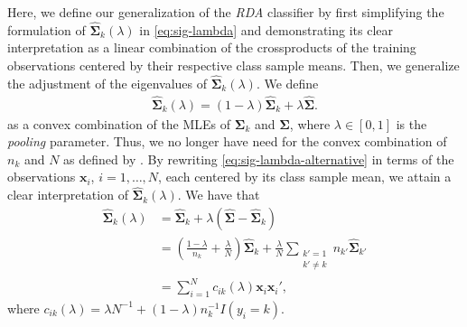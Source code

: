 \documentclass[11pt]{article}
\begin{document}
Here, we define our generalization of the \emph{RDA} classifier by first simplifying the formulation of $\widehat{\bm \Sigma}_k(\lambda)$ in \eqref{eq:sig-lambda} and demonstrating its clear interpretation as a linear combination of the crossproducts of the training observations centered by their respective class sample means. Then, we generalize the adjustment of the eigenvalues of $\widehat{\bm \Sigma}_k(\lambda)$.  We define
\begin{align}
  \widehat{\bm\Sigma}_k(\lambda) = (1 - \lambda) \widehat{\bm\Sigma}_k + \lambda \widehat{\bm\Sigma}.\label{eq:sig-lambda-alternative}
\end{align}
as a convex combination of the MLEs of $\bm \Sigma_k$ and $\bm \Sigma$, where $\lambda \in [0, 1]$ is the \emph{pooling} parameter. Thus, we no longer have need for the convex combination of $n_k$ and $N$ as defined by \cite{Friedman:1989tm}. By rewriting \eqref{eq:sig-lambda-alternative} in terms of the observations $\bm x_i$, $i = 1, \ldots, N$, each centered by its class sample mean, we attain a clear interpretation of $\widehat{\bm\Sigma}_k(\lambda)$. We have that
\begin{align}
	\widehat{\bm\Sigma}_k(\lambda) &= \widehat{\bm\Sigma}_k + \lambda (\widehat{\bm\Sigma} - \widehat{\bm\Sigma}_k) \nonumber\\
	&= \left( \frac{1 - \lambda}{n_k} + \frac{\lambda}{N} \right) \widehat{\bm\Sigma}_k +  \frac{\lambda}{N} \sum_{\substack{k' = 1\\k' \ne k}} n_{k'} \widehat{\bm\Sigma}_{k'} \nonumber \\
	&= \sum_{i=1}^N c_{ik}(\lambda) \bm x_i \bm x_i',\label{eq:sig-lambda-alternative2}
\end{align}
where $c_{ik}(\lambda) = \lambda N^{-1} + (1 - \lambda)n_k^{-1}I(y_i = k)$.
\end{document}
